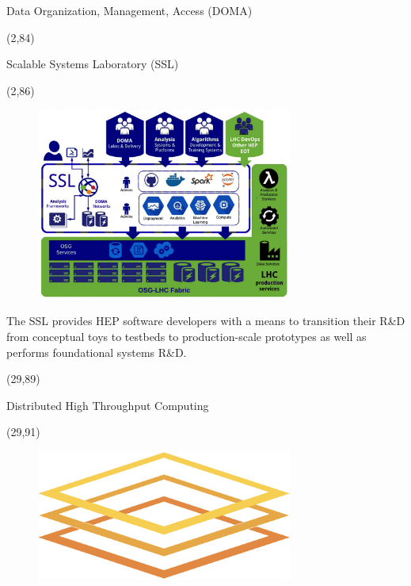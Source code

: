 \documentclass[final]{beamer}
\begin{document}
\begin{frame}{}
\begin{textblock}{25.0}
\begin{block}{Data Organization, Management, Access (DOMA)}
\begin{textblock}{25.0}
\end{textblock}
\end{block}
\end{textblock}
\begin{textblock}{25.0}(2,84)
\begin{block}{Scalable Systems Laboratory (SSL)}
\begin{textblock}{25.0}(2,86)
\begin{figure}[tbph]
\centering
\includegraphics[width=0.75\textwidth]{images/ssl.png}
\end{figure}
The SSL provides HEP software developers with a means to transition their R\&D from conceptual toys to testbeds to production-scale prototypes as well as performs foundational systems R\&D.
\end{textblock}
\end{block}
\end{textblock}
\begin{textblock}{25.0}(29,89)
\begin{block}{Distributed High Throughput Computing}
\begin{textblock}{25.0}(29,91)
\begin{figure}[tbph]
\centering
\includegraphics[width=0.75\textwidth]{images/osg-logo.png}

\end{figure}
\end{textblock}
\end{block}
\end{textblock}
\end{frame}
\end{document}
